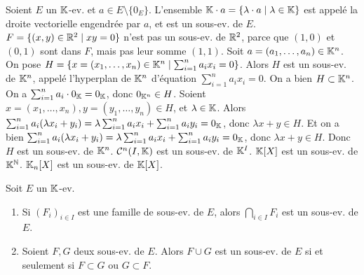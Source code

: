 \documentclass[12pt, a4paper]{report}
\begin{document}
\begin{example}
    \begin{outline}
        \1 Soient $E$ un $\mathbb{K}$-ev. et $a \in E\setminus\{0_E\}$. L'ensemble $\mathbb{K} \cdot a = \{\lambda \cdot a \mid \lambda \in \mathbb{K}\}$ est appelé la droite vectorielle engendrée par $a$, et est un sous-ev. de $E$.
        \1 $F = \{(x,y) \in \mathbb{R}^2 \mid xy = 0\}$ n'est pas un sous-ev. de $\mathbb{R}^2$, parce que $(1,0)$ et $(0,1)$ sont dans $F$, mais pas leur somme $(1,1)$.
        \1 Soit $a = (a_1,\dots,a_n) \in \mathbb{K}^n$. On pose $H = \{x=(x_1,\dots,x_n) \in \mathbb{K}^n \mid \sum_{i=1}^{n} a_i x_i = 0\}$. Alors $H$ est un sous-ev. de $\mathbb{K}^n$, appelé l'hyperplan de $\mathbb{K}^n$ d'équation $\sum_{i=1}^n a_i x_i = 0$.
            \2 On a bien $H \subset \mathbb{K}^n$.
            \2 On a $\sum_{i=1}^{n}a_i \cdot 0_{\mathbb{K}} = 0_{\mathbb{K}}$, donc $0_{\mathbb{K}^n} \in H$.
            \2 Soient $x=(x_1,\dots,x_n), y=(y_1,\dots,y_n) \in H$, et $\lambda \in \mathbb{K}$. Alors $\sum_{i=1}^{n} a_i (\lambda x_i + y_i) = \lambda \sum_{i=1}^{n} a_i x_i + \sum_{i=1}^{n} a_i y_i = 0_{\mathbb{K}}$, donc $\lambda x + y \in H$.
            \2 Et on a bien $\sum_{i=1}^{n} a_i (\lambda x_i + y_i) = \lambda \sum_{i=1}^{n} a_i x_i + \sum_{i=1}^{n} a_i y_i = 0_{\mathbb{K}}$, donc $\lambda x + y \in H$.
            \2 Donc $H$ est un sous-ev. de $\mathbb{K}^n$.
        \1 $\mathcal{C}^{n}(I,\mathbb{K})$ est un sous-ev. de $\mathbb{K}^I$.
        \1 $\mathbb{K}[X]$ est un sous-ev. de $\mathbb{K}^{\mathbb{N}}$.
        \1 $\mathbb{K}_n[X]$ est un sous-ev. de $\mathbb{K}[X]$.
    \end{outline}
\end{example}

\begin{property}
    Soit $E$ un $\mathbb{K}$-ev.
    \begin{enumerate}
        \item Si $(F_i)_{i\in I}$ est une famille de sous-ev. de $E$, alors $\bigcap_{i\in I} F_i$ est un sous-ev. de $E$.
        \item Soient $F,G$ deux sous-ev. de $E$. Alors $F \cup G$ est un sous-ev. de $E$ si et seulement si $F \subset G$ ou $G \subset F$.
    \end{enumerate}
\end{property}
\end{document}

